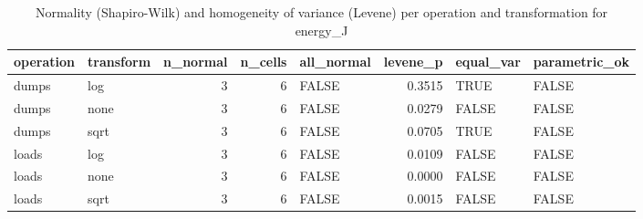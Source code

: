 \begin{table}[ht]
\centering
\begin{tabular}{llrrlrll}
  \toprule
operation & transform & n\_normal & n\_cells & all\_normal & levene\_p & equal\_var & parametric\_ok \\ 
  \midrule
dumps & log &     3 &     6 & FALSE & 0.3515 & TRUE & FALSE \\ 
  dumps & none &     3 &     6 & FALSE & 0.0279 & FALSE & FALSE \\ 
  dumps & sqrt &     3 &     6 & FALSE & 0.0705 & TRUE & FALSE \\ 
  loads & log &     3 &     6 & FALSE & 0.0109 & FALSE & FALSE \\ 
  loads & none &     3 &     6 & FALSE & 0.0000 & FALSE & FALSE \\ 
  loads & sqrt &     3 &     6 & FALSE & 0.0015 & FALSE & FALSE \\ 
   \bottomrule
\end{tabular}
\caption{Normality (Shapiro-Wilk) and homogeneity of variance (Levene) per operation and transformation for energy_J} 
\label{tab:assumptions_summary_RQ1_energy}
\end{table}
